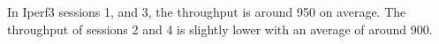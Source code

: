 In Iperf3 sessions 1, and 3, the throughput is around 950 on average. The throughput of sessions 2 and 4 is slightly lower with an average of around 900.